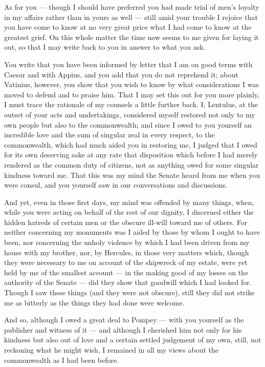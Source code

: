  As for you --- though I should have preferred you had made trial of men's loyalty in my affairs rather than in yours as well --- still amid your trouble I rejoice that you have come to know at no very great price what I had come to know at the greatest grief. On this whole matter the time now seems to me given for laying it out, so that I may write back to you in answer to what you ask.

 You write that you have been informed by letter that I am on good terms with Caesar and with Appius, and you add that you do not reprehend it; about Vatinius, however, you show that you wish to know by what considerations I was moved to defend and to praise him. That I may set this out for you more plainly, I must trace the rationale of my counsels a little further back. I, Lentulus, at the outset of your acts and undertakings, considered myself restored not only to my own people but also to the commonwealth; and since I owed to you yourself an incredible love and the sum of singular zeal in every respect, to the commonwealth, which had much aided you in restoring me, I judged that I owed for its own deserving sake at any rate that disposition which before I had merely rendered as the common duty of citizens, not as anything owed for some singular kindness toward me. That this was my mind the Senate heard from me when you were consul, and you yourself saw in our conversations and discussions.

 And yet, even in those first days, my mind was offended by many things, when, while you were acting on behalf of the rest of our dignity, I discerned either the hidden hatreds of certain men or the obscure ill-will toward me of others. For neither concerning my monuments was I aided by those by whom I ought to have been, nor concerning the unholy violence by which I had been driven from my house with my brother, nor, by Hercules, in those very matters which, though they were necessary to me on account of the shipwreck of my estate, were yet held by me of the smallest account --- in the making good of my losses on the authority of the Senate --- did they show that goodwill which I had looked for. Though I saw these things (and they were not obscure), still they did not strike me as bitterly as the things they had done were welcome.

 And so, although I owed a great deal to Pompey --- with you yourself as the publisher and witness of it --- and although I cherished him not only for his kindness but also out of love and a certain settled judgement of my own, still, not reckoning what he might wish, I remained in all my views about the commonwealth as I had been before.

